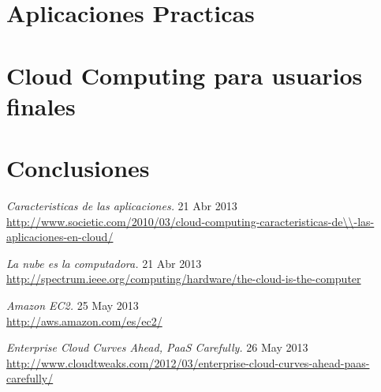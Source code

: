 \documentclass[12pt,a4paper]{article}
\begin{document}
\section{Aplicaciones Practicas}

\section{Cloud Computing para usuarios finales}

\section{Conclusiones}

\newpage

\begin{thebibliography}{1}

\emph{Caracteristicas de las aplicaciones. }
 21 Abr 2013\\
\url{http://www.societic.com/2010/03/cloud-computing-caracteristicas-de\\-las-aplicaciones-en-cloud/}
 
\emph{La nube es la computadora. } 
 21 Abr 2013\\
 \url{http://spectrum.ieee.org/computing/hardware/the-cloud-is-the-computer}

\emph{Amazon EC2. }
 25 May 2013\\
 \url{http://aws.amazon.com/es/ec2/} 

\emph{Enterprise Cloud Curves Ahead, PaaS Carefully. }
 26 May 2013\\
 \url{http://www.cloudtweaks.com/2012/03/enterprise-cloud-curves-ahead-paas-carefully/}

\end{thebibliography}
\end{document}
